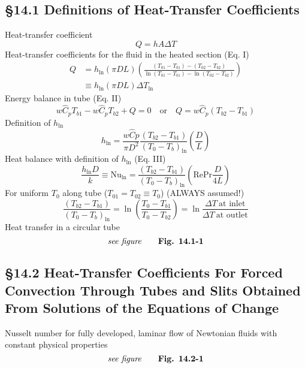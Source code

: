 \subsection{\S14.1 Definitions of Heat-Transfer Coefficients}
Heat-transfer coefficient
\[
	Q=hA\Delta T\tag{14.1-1}
\]
Heat-transfer coefficients for the fluid in the heated section (Eq. I)
\begin{align*}
	Q & =h_{\ln}(\pi DL)\left(\frac{(T_{01}-T_{b1})-(T_{02}-T_{b2})}{\ln(T_{01}-T_{b1})-\ln(T_{02}-T_{b2})}\right) \\
	  & \equiv h_{\ln}(\pi DL)\Delta T_{\ln}\tag{14.1-4}
\end{align*}
Energy balance in tube (Eq. II)
\[
	w\hat{C}_pT_{b1} - w\hat{C}_pT_{b2} + Q=0 \quad \text{or} \quad Q=w\hat{C}_p(T_{b2}-T_{b1})\tag{14.1-10}
\]
Definition of $h_{\ln}$
\[
	h_{\ln}=\frac{w\hat{C}{p}}{\pi D^2}\frac{(T_{b2}-T_{b1})}{(T_0-T_b)_{\ln}}\left(\frac{D}{L}\right)\tag{14.1-14}
\]
Heat balance with definition of $h_{\ln}$ (Eq. III)
\[
	\frac{h_{\ln}D}{k} \equiv \text{Nu}_{\ln}=\frac{(T_{b2}-T_{b1})}{(T_0-T_b)_{\ln}}\left(\text{Re}\text{Pr}\frac{D}{4L}\right)\tag*{Lecture notes 15.2}
\]
For uniform $T_0$ along tube ($T_{01}=T_{02}\equiv T_0$) (ALWAYS assumed!)
\[
	\frac{(T_{b2}-T_{b1})}{(T_0-T_b)_{\ln}}=\ln\left(\frac{T_0-T_{b1}}{T_0-T_{b2}}\right)=\ln\frac{\Delta T \ \text{at inlet}}{\Delta T \ \text{at outlet}}\tag*{Lecture notes 15.2}
\]
Heat transfer in a circular tube
\[
	\textit{see figure}\tag*{\textbf{Fig. 14.1-1}}
\]
\subsection{\S14.2 Heat-Transfer Coefficients For Forced Convection Through Tubes and Slits Obtained From Solutions of the Equations of Change}
Nusselt number for fully developed, laminar flow of Newtonian fluids with constant physical properties
\[
	\textit{see figure}\tag*{\textbf{Fig. 14.2-1}}
\]
